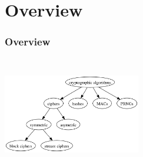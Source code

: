 \section{Overview}
\begin{frame}
	\frametitle{Overview}
	\includegraphics[width=6cm,height=5cm]{cipheroverview}
\end{frame}
